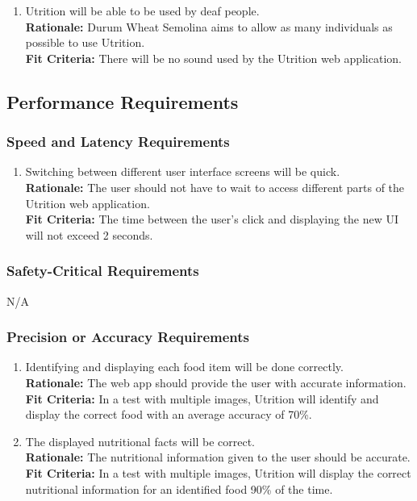 \documentclass[12pt]{article}
\begin{document}
\begin{enumerate}[{UH}6. ] 
	\item Utrition will be able to be used by deaf people.\\
	\textbf{Rationale:} Durum Wheat Semolina aims to allow as many individuals as possible to use Utrition.\\
	\textbf{Fit Criteria:} There will be no sound used by the Utrition web application. 
\end{enumerate}

\subsection{Performance Requirements}

\subsubsection{Speed and Latency Requirements}

\begin{enumerate}[start=1,label={PR\arabic*.}]
	\item Switching between different user interface screens will be quick.\\
	\textbf{Rationale:} The user should not have to wait to access different parts of the Utrition web application.\\
	\textbf{Fit Criteria:} The time between the user’s click and displaying the new UI will not exceed 2 seconds.
\end{enumerate}

\subsubsection{Safety-Critical Requirements}
\hspace{1.5cm}N/A

\subsubsection{Precision or Accuracy Requirements}

\begin{enumerate}[start=2,label={PR\arabic*.}]
	\item Identifying and displaying each food item will be done correctly. \\
	\textbf{Rationale:} The web app should provide the user with accurate information. \\
	\textbf{Fit Criteria:} In a test with multiple images, Utrition will identify and display the correct food with an average accuracy of 70\%.
	\item  The displayed nutritional facts will be correct. \\
	\textbf{Rationale:} The nutritional information given to the user should be accurate. \\
	\textbf{Fit Criteria:} In a test with multiple images, Utrition will display the correct nutritional information for an identified food 90\% of the time.
\end{enumerate}
\end{document}

